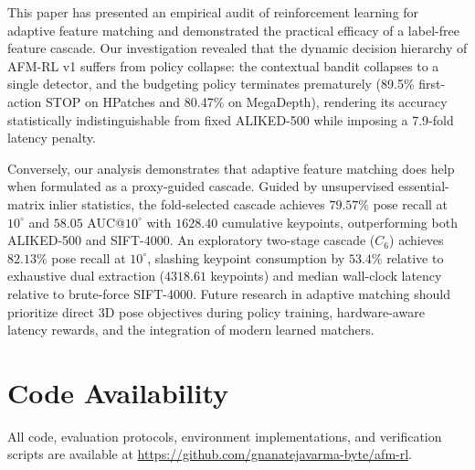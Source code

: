 \documentclass[conference]{IEEEtran}
\begin{document}
This paper has presented an empirical audit of reinforcement learning for adaptive feature matching and demonstrated the practical efficacy of a label-free feature cascade. Our investigation revealed that the dynamic decision hierarchy of AFM-RL v1 suffers from policy collapse: the contextual bandit collapses to a single detector, and the budgeting policy terminates prematurely (89.5\% first-action STOP on HPatches and 80.47\% on MegaDepth), rendering its accuracy statistically indistinguishable from fixed ALIKED-500 while imposing a 7.9-fold latency penalty.

Conversely, our analysis demonstrates that adaptive feature matching does help when formulated as a proxy-guided cascade. Guided by unsupervised essential-matrix inlier statistics, the fold-selected cascade achieves $79.57\%$ pose recall at $10^\circ$ and $58.05$ AUC@$10^\circ$ with $1628.40$ cumulative keypoints, outperforming both ALIKED-500 and SIFT-4000. An exploratory two-stage cascade ($C_6$) achieves $82.13\%$ pose recall at $10^\circ$, slashing keypoint consumption by $53.4\%$ relative to exhaustive dual extraction ($4318.61$ keypoints) and median wall-clock latency relative to brute-force SIFT-4000. Future research in adaptive matching should prioritize direct 3D pose objectives during policy training, hardware-aware latency rewards, and the integration of modern learned matchers.

\section*{Code Availability}
All code, evaluation protocols, environment implementations, and verification scripts are available at \url{https://github.com/gnanatejavarma-byte/afm-rl}.
\end{document}
